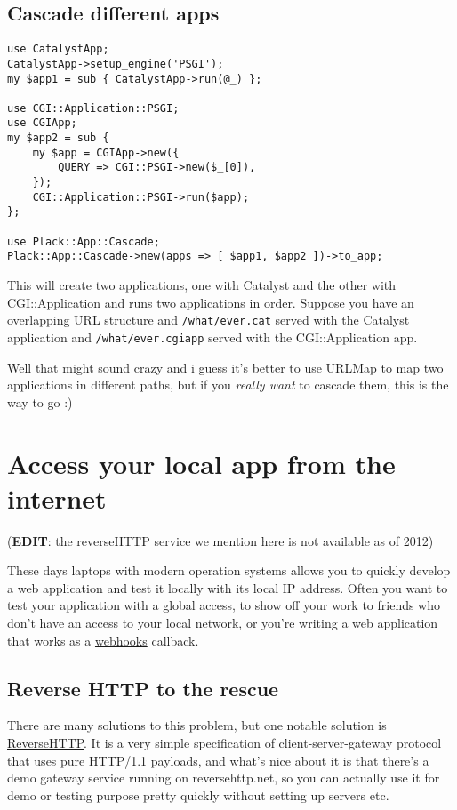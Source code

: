 \section{Cascade different apps}\label{cascade-different-apps}

\begin{lstlisting}
use CatalystApp;
CatalystApp->setup_engine('PSGI');
my $app1 = sub { CatalystApp->run(@_) };

use CGI::Application::PSGI;
use CGIApp;
my $app2 = sub {
    my $app = CGIApp->new({
        QUERY => CGI::PSGI->new($_[0]),
    });
    CGI::Application::PSGI->run($app);
};

use Plack::App::Cascade;
Plack::App::Cascade->new(apps => [ $app1, $app2 ])->to_app;
\end{lstlisting}

This will create two applications, one with Catalyst and the other with
CGI::Application and runs two applications in order. Suppose you have an
overlapping URL structure and \lstinline!/what/ever.cat! served with the
Catalyst application and \lstinline!/what/ever.cgiapp! served with the
CGI::Application app.

Well that might sound crazy and i guess it's better to use URLMap to map
two applications in different paths, but if you \emph{really want} to
cascade them, this is the way to go :)

\chapter{Access your local app from the
internet}\label{day-20-access-your-local-app-from-the-internet}

(\textbf{EDIT}: the reverseHTTP service we mention here is not available
as of 2012)

These days laptops with modern operation systems allows you to quickly
develop a web application and test it locally with its local IP address.
Often you want to test your application with a global access, to show
off your work to friends who don't have an access to your local network,
or you're writing a web application that works as a
\href{http://www.webhooks.org/}{webhooks} callback.

\section{Reverse HTTP to the
rescue}\label{reverse-http-to-the-rescue}

There are many solutions to this problem, but one notable solution is
\href{http://www.reversehttp.net/}{ReverseHTTP}. It is a very simple
specification of client-server-gateway protocol that uses pure HTTP/1.1
payloads, and what's nice about it is that there's a demo gateway
service running on reversehttp.net, so you can actually use it for demo
or testing purpose pretty quickly without setting up servers etc.

